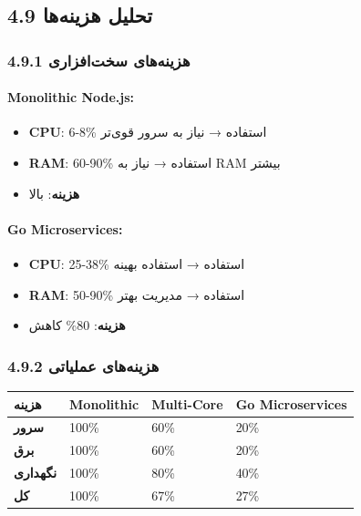 \documentclass[
]{article}
\newcounter{none} %
\providecommand{\tightlist}{%
  \setlength{\itemsep}{0pt}\setlength{\parskip}{0pt}}
\begin{document}
\subsection{4.9 تحلیل
هزینه‌ها}\label{ux62aux62dux644ux6ccux644-ux647ux632ux6ccux646ux647ux647ux627}

\subsubsection{4.9.1 هزینه‌های
سخت‌افزاری}\label{ux647ux632ux6ccux646ux647ux647ux627ux6cc-ux633ux62eux62aux627ux641ux632ux627ux631ux6cc}

\paragraph{Monolithic Node.js:}\label{monolithic-node.js-1}

\begin{itemize}
\tightlist
\item
  \textbf{CPU}: 6-8\% استفاده → نیاز به سرور قوی‌تر
\item
  \textbf{RAM}: 60-90\% استفاده → نیاز به RAM بیشتر
\item
  \textbf{هزینه}: بالا
\end{itemize}

\paragraph{Go Microservices:}\label{go-microservices-1}

\begin{itemize}
\tightlist
\item
  \textbf{CPU}: 25-38\% استفاده → استفاده بهینه
\item
  \textbf{RAM}: 50-90\% استفاده → مدیریت بهتر
\item
  \textbf{هزینه}: 80\% کاهش
\end{itemize}

\subsubsection{4.9.2 هزینه‌های
عملیاتی}\label{ux647ux632ux6ccux646ux647ux647ux627ux6cc-ux639ux645ux644ux6ccux627ux62aux6cc}

{\def\LTcaptype{none} %
\begin{longtable}[]{@{}llll@{}}
\toprule\noalign{}
هزینه & Monolithic & Multi-Core & Go Microservices \\
\midrule\noalign{}
\endhead
\bottomrule\noalign{}
\endlastfoot
\textbf{سرور} & 100\% & 60\% & 20\% \\
\textbf{برق} & 100\% & 60\% & 20\% \\
\textbf{نگهداری} & 100\% & 80\% & 40\% \\
\textbf{کل} & 100\% & 67\% & 27\% \\
\end{longtable}
}
\end{document}
